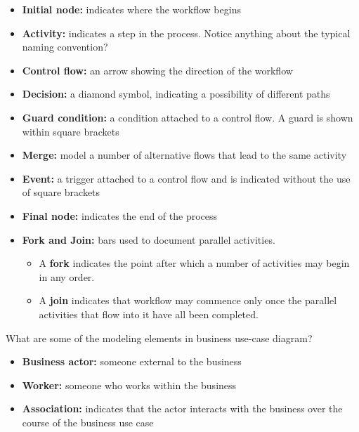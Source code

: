 \documentclass[10pt,a4paper,answers]{exam}
\begin{document}
\begin{questions}
\begin{solution}
\begin{itemize}
        \item \textbf{Initial node:}  indicates where the workflow begins
        \item \textbf{Activity:} indicates a step in the process. Notice anything about the typical naming convention?
        \item \textbf{Control flow:} an arrow showing the direction of the workflow
        \item \textbf{Decision:} a diamond symbol, indicating a possibility of different paths
        \item \textbf{Guard condition:} a condition attached to a control flow. A guard is shown within square brackets
        \item \textbf{Merge:} model a number of alternative flows that lead to the same activity
        \item \textbf{Event:} a trigger attached to a control flow and is indicated without the use of square brackets
        \item \textbf{Final node:} indicates the end of the process
        \item \textbf{Fork and Join:} bars used to document parallel activities.
        \begin{itemize}
                \item A \textbf{fork} indicates the point after which a number of activities may begin in any order. 
                \item A \textbf{join} indicates that workflow may commence only once the parallel activities that flow into it have all been completed.
        \end{itemize}

\end{itemize}
\end{solution}


\question What are some of the modeling elements in business use-case diagram?
\begin{solution}
\begin{itemize}

        \item \textbf{Business actor:} someone external to the business
        \item \textbf{Worker:} someone who works within the business
        \item \textbf{Association:} indicates that the actor interacts with the business over the course of the business use case


\end{itemize}
\end{solution}
\end{questions}
\end{document}

